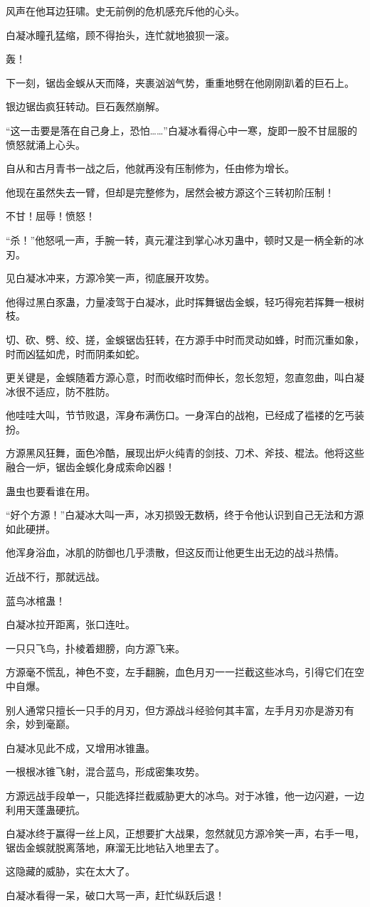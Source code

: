 \begin{this_body}
风声在他耳边狂啸。史无前例的危机感充斥他的心头。

白凝冰瞳孔猛缩，顾不得抬头，连忙就地狼狈一滚。

轰！

下一刻，锯齿金蜈从天而降，夹裹汹汹气势，重重地劈在他刚刚趴着的巨石上。

银边锯齿疯狂转动。巨石轰然崩解。

“这一击要是落在自己身上，恐怕……”白凝冰看得心中一寒，旋即一股不甘屈服的愤怒就涌上心头。

自从和古月青书一战之后，他就再没有压制修为，任由修为增长。

他现在虽然失去一臂，但却是完整修为，居然会被方源这个三转初阶压制！

不甘！屈辱！愤怒！

“杀！”他怒吼一声，手腕一转，真元灌注到掌心冰刃蛊中，顿时又是一柄全新的冰刃。

见白凝冰冲来，方源冷笑一声，彻底展开攻势。

他得过黑白豕蛊，力量凌驾于白凝冰，此时挥舞锯齿金蜈，轻巧得宛若挥舞一根树枝。

切、砍、劈、绞、搓，金蜈锯齿狂转，在方源手中时而灵动如蜂，时而沉重如象，时而凶猛如虎，时而阴柔如蛇。

更关键是，金蜈随着方源心意，时而收缩时而伸长，忽长忽短，忽直忽曲，叫白凝冰很不适应，防不胜防。

他哇哇大叫，节节败退，浑身布满伤口。一身浑白的战袍，已经成了褴褛的乞丐装扮。

方源黑风狂舞，面色冷酷，展现出炉火纯青的剑技、刀术、斧技、棍法。他将这些融合一炉，锯齿金蜈化身成索命凶器！

蛊虫也要看谁在用。

“好个方源！”白凝冰大叫一声，冰刃损毁无数柄，终于令他认识到自己无法和方源如此硬拼。

他浑身浴血，冰肌的防御也几乎溃散，但这反而让他更生出无边的战斗热情。

近战不行，那就远战。

蓝鸟冰棺蛊！

白凝冰拉开距离，张口连吐。

一只只飞鸟，扑棱着翅膀，向方源飞来。

方源毫不慌乱，神色不变，左手翻腕，血色月刃一一拦截这些冰鸟，引得它们在空中自爆。

别人通常只擅长一只手的月刃，但方源战斗经验何其丰富，左手月刃亦是游刃有余，妙到毫巅。

白凝冰见此不成，又增用冰锥蛊。

一根根冰锥飞射，混合蓝鸟，形成密集攻势。

方源远战手段单一，只能选择拦截威胁更大的冰鸟。对于冰锥，他一边闪避，一边利用天蓬蛊硬抗。

白凝冰终于赢得一丝上风，正想要扩大战果，忽然就见方源冷笑一声，右手一甩，锯齿金蜈就脱离落地，麻溜无比地钻入地里去了。

这隐藏的威胁，实在太大了。

白凝冰看得一呆，破口大骂一声，赶忙纵跃后退！

\end{this_body}

